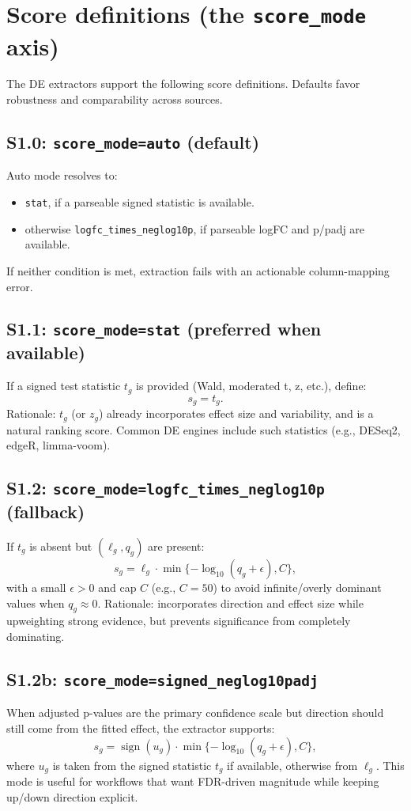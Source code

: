 \documentclass[11pt]{article}
\begin{document}
\section{Score definitions (the \texttt{score\_mode} axis)}
The DE extractors support the following score definitions. Defaults favor robustness and comparability across sources.

\subsection{S1.0: \texttt{score\_mode=auto} (default)}
Auto mode resolves to:
\begin{itemize}[leftmargin=2em]
\item \texttt{stat}, if a parseable signed statistic is available.
\item otherwise \texttt{logfc\_times\_neglog10p}, if parseable logFC and p/padj are available.
\end{itemize}
If neither condition is met, extraction fails with an actionable column-mapping error.

\subsection{S1.1: \texttt{score\_mode=stat} (preferred when available)}
If a signed test statistic $t_g$ is provided (Wald, moderated t, z, etc.), define:
\[
s_g = t_g.
\]
Rationale: $t_g$ (or $z_g$) already incorporates effect size and variability, and is a natural ranking score.
Common DE engines include such statistics (e.g., DESeq2, edgeR, limma-voom). \cite{love2014deseq2, robinson2010edger, law2014voom}

\subsection{S1.2: \texttt{score\_mode=logfc\_times\_neglog10p} (fallback)}
If $t_g$ is absent but $(\ell_g, q_g)$ are present:
\begin{equation}
s_g = \ell_g \cdot \min\{-\log_{10}(q_g + \epsilon), C\},
\label{eq:logfc_p}
\end{equation}
with a small $\epsilon > 0$ and cap $C$ (e.g., $C=50$) to avoid infinite/overly dominant values when $q_g \approx 0$.
Rationale: incorporates direction and effect size while upweighting strong evidence, but prevents significance from completely dominating.

\subsection{S1.2b: \texttt{score\_mode=signed\_neglog10padj}}
When adjusted p-values are the primary confidence scale but direction should still come from the fitted effect, the extractor supports:
\begin{equation}
s_g = \operatorname{sign}(u_g) \cdot \min\{-\log_{10}(q_g + \epsilon), C\},
\label{eq:signed_neglog10padj}
\end{equation}
where $u_g$ is taken from the signed statistic $t_g$ if available, otherwise from $\ell_g$.
This mode is useful for workflows that want FDR-driven magnitude while keeping up/down direction explicit.
\end{document}

